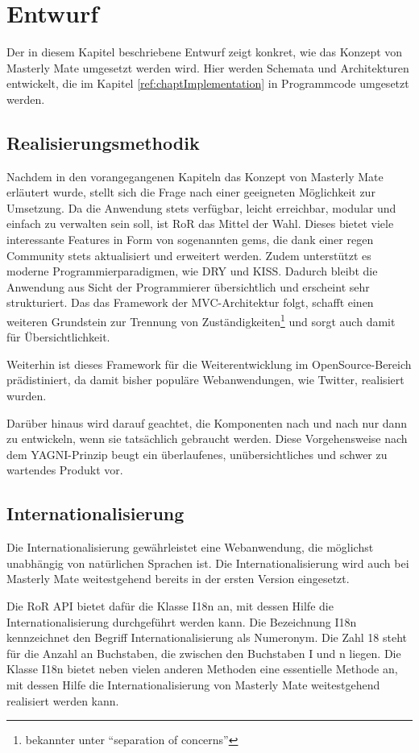 \chapter{Entwurf}\label{ref:chaptScript}
Der in diesem Kapitel beschriebene Entwurf zeigt konkret, wie das Konzept von
Masterly Mate umgesetzt werden wird. Hier werden Schemata und Architekturen
entwickelt, die im Kapitel \ref{ref:chaptImplementation} in Programmcode
umgesetzt werden.

\section{Realisierungsmethodik}
Nachdem in den vorangegangenen Kapiteln das Konzept von Masterly Mate erläutert
wurde, stellt sich die Frage nach einer geeigneten Möglichkeit zur Umsetzung. Da
die Anwendung stets verfügbar, leicht erreichbar, modular und einfach zu
verwalten sein soll, ist \ac{RoR} das Mittel der Wahl. Dieses bietet viele
interessante Features in Form von sogenannten gems, die dank einer regen
Community stets aktualisiert und erweitert werden. Zudem unterstützt es moderne
Programmierparadigmen, wie \ac{DRY} und \ac{KISS}. Dadurch bleibt die Anwendung
aus Sicht der Programmierer übersichtlich und erscheint sehr strukturiert. Das
das Framework der \ac{MVC}-Architektur folgt, schafft einen weiteren Grundstein
zur Trennung von Zuständigkeiten\footnote{bekannter unter "`separation of
concerns"'} und sorgt auch damit für Übersichtlichkeit. 

Weiterhin ist dieses Framework für die Weiterentwicklung im
OpenSource-Bereich prädistiniert, da damit bisher populäre
Webanwendungen, wie Twitter, realisiert wurden.

Darüber hinaus wird darauf geachtet, die Komponenten nach und nach nur dann zu
entwickeln, wenn sie tatsächlich gebraucht werden. Diese Vorgehensweise nach dem
\ac{YAGNI}-Prinzip beugt ein überlaufenes, unübersichtliches und schwer
zu wartendes Produkt vor.

\section{Internationalisierung}\label{ref:internationalisierung}
Die Internationalisierung gewährleistet eine Webanwendung, die möglichst
unabhängig von natürlichen Sprachen ist. Die Internationalisierung wird auch bei
Masterly Mate weitestgehend bereits in der ersten Version eingesetzt.

Die RoR API bietet dafür die Klasse I18n an, mit dessen Hilfe die
Internationalisierung durchgeführt werden kann. Die Bezeichnung I18n
kennzeichnet den Begriff Internationalisierung als Numeronym. Die Zahl 18 steht
für die Anzahl an Buchstaben, die zwischen den Buchstaben I und n liegen.
Die Klasse I18n bietet neben vielen anderen Methoden eine essentielle Methode
an, mit dessen Hilfe die Internationalisierung von Masterly Mate weitestgehend
realisiert werden kann. 

